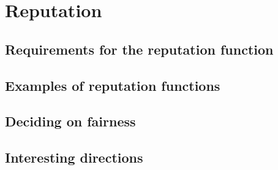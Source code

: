\chapter{Reputation}\label{chapter:reputation}
\section{Requirements for the reputation function}\label{section:requirements_reputation}

\section{Examples of reputation functions}\label{section:examples_reputation_functions}

\section{Deciding on fairness}

\section{Interesting directions}
